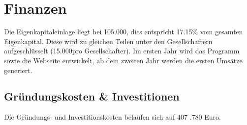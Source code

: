 \chapter{Finanzen}
  Die Eigenkapitaleinlage liegt bei 105.000\EURcr, dies entspricht 17.15\% vom gesamten Eigenkapital. Diese wird zu gleichen Teilen unter den Gesellschaftern aufgeschlüsselt (15.000\EURcr pro Gesellschafter). Im ersten Jahr wird das Programm sowie die Webseite entwickelt, ab dem zweiten Jahr werden die ersten Umsätze generiert.
    
    \section{Gr\"undungskosten \& Investitionen}
        Die Gründungs- und Investitionskosten belaufen sich auf 407 .780 Euro. 
        
